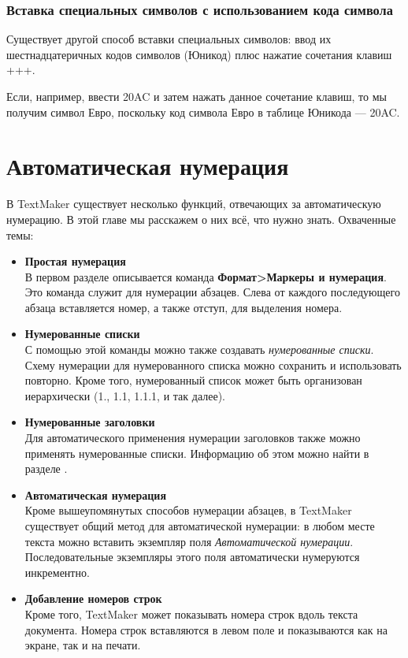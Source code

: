﻿\documentclass[a4paper,10pt]{article}
\begin{document}
\subsubsection{Вставка специальных символов с использованием кода символа}
Существует другой способ вставки специальных символов: ввод их шестнадцатеричных кодов символов (Юникод) плюс нажатие сочетания клавиш +++.

Если, например, ввести 20AC и затем нажать данное сочетание клавиш, то мы получим символ Евро, поскольку код символа Евро в таблице Юникода — 20AC.

\section{Автоматическая нумерация} \label{sec:автонумерация}

В TextMaker существует несколько функций, отвечающих за автоматическую нумерацию. В этой главе мы расскажем о них всё, что нужно знать. Охваченные темы:

\begin{itemize}
 \item \textbf{Простая нумерация}\\
 В первом разделе описывается команда \textbf{Формат>Маркеры и нумерация}. Это команда служит для нумерации абзацев. Слева от каждого последующего абзаца вставляется номер, а также отступ, для выделения номера.
 \item \textbf{Нумерованные списки}\\
 С помощью этой команды можно также создавать \textit{нумерованные списки}. Схему нумерации для нумерованного списка можно сохранить и использовать повторно. Кроме того, нумерованный список может быть организован иерархически (1., 1.1, 1.1.1, и так далее).
 \item \textbf{Нумерованные заголовки}\\
 Для автоматического применения нумерации заголовков также можно применять нумерованные списки. Информацию об этом можно найти в разделе .
 \item \textbf{Автоматическая нумерация}\\
 Кроме вышеупомянутых способов нумерации абзацев, в TextMaker существует общий метод для автоматической нумерации: в любом месте текста можно вставить экземпляр поля \textit{Автоматической нумерации}. Последовательные экземпляры этого поля автоматически нумеруются инкрементно.
 \item \textbf{Добавление номеров строк}\\
 Кроме того, TextMaker может показывать номера строк вдоль текста документа. Номера строк вставляются в левом поле и показываются как на экране, так и на печати.
\end{itemize}  
\end{document}
